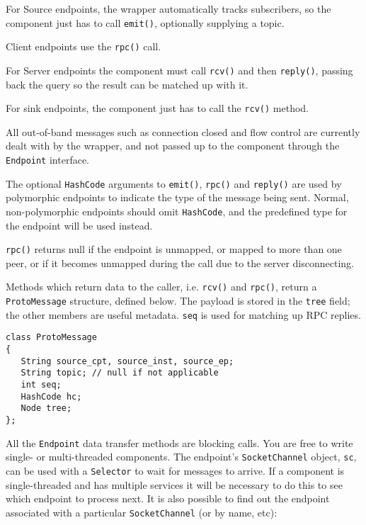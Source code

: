 \documentclass[12pt,a4paper,twoside]{article}
\renewcommand{\_}{\texttt{\symbol{95}}}
\begin{document}
For Source endpoints, the wrapper automatically tracks subscribers, so the
component just has to call \verb^emit()^, optionally supplying a topic.

Client endpoints use the \verb^rpc()^ call.

For Server endpoints the component must call \verb^rcv()^ and then
\verb^reply()^, passing back the query so the result can be matched up with it.

For sink endpoints, the component just has to call the \verb^rcv()^ method.

All out-of-band messages such as connection closed and flow control
are currently dealt with by the wrapper, and not passed up to the
component through the \texttt{Endpoint} interface.

The optional \verb^HashCode^ arguments to \verb^emit()^, \verb^rpc()^
and \verb^reply()^ are used by polymorphic endpoints to indicate the
type of the message being sent. Normal, non-polymorphic endpoints
should omit \verb^HashCode^, and the predefined type for the endpoint
will be used instead.

\verb^rpc()^ returns null if the endpoint is unmapped, or mapped to
more than one peer, or if it becomes unmapped during the call due to
the server disconnecting.


Methods which return data to the caller, i.e. \verb^rcv()^ and \verb^rpc()^,
return a \verb^ProtoMessage^ structure, defined below. The payload
is stored in the \verb^tree^ field; the other members are useful
metadata. \verb^seq^ is used for matching up RPC replies.

\begin{verbatim}
class ProtoMessage
{
   String source_cpt, source_inst, source_ep;
   String topic; // null if not applicable
   int seq;
   HashCode hc;
   Node tree;
};
\end{verbatim}

All the \verb^Endpoint^ data transfer methods are blocking calls.
You are free to write single- or multi-threaded components.
The endpoint's \verb^SocketChannel^ object, \verb^sc^, can be used with a
\verb^Selector^ to wait for messages to arrive.
If a component is single-threaded and has multiple services it
will be necessary to do this to see which endpoint to process next.
It is also possible
to find out the endpoint associated with a particular \verb^SocketChannel^
(or by name, etc):
\end{document}
